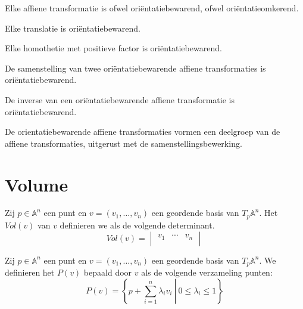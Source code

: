 \documentclass[main.tex]{subfiles}
\begin{document}
\begin{st}
  Elke affiene transformatie is ofwel ori\"entatiebewarend, ofwel ori\"entatieomkerend.
\end{st}

\begin{st}
  Elke translatie is ori\"entatiebewarend.
\end{st}

\begin{st}
  Elke homothetie met positieve factor is ori\"entatiebewarend.
\end{st}

\begin{st}
  De samenstelling van twee ori\"entatiebewarende affiene transformaties is ori\"entatiebewarend.
\end{st}

\begin{st}
  De inverse van een ori\"entatiebewarende affiene transformatie is ori\"entatiebewarend.
\end{st}

\begin{st}
  De orientatiebewarende affiene transformaties vormen een deelgroep van de affiene transformaties, uitgerust met de samenstellingsbewerking.
\end{st}

\section{Volume}
\label{sec:volume}

\begin{de}
  Zij $p\in \mathbb{A}^{n}$ een punt en $v= (v_{1},\dotsc,v_{n})$ een geordende basis van $T_{p}\mathbb{A}^{n}$.
  Het  $Vol(v)$ van $v$ definieren we als de volgende determinant.
  \[
  Vol(v) = 
  \begin{vmatrix}
    v_{1} & \cdots & v_{n}\\
  \end{vmatrix}
  \]
\end{de}

\begin{de}
  Zij $p\in \mathbb{A}^{n}$ een punt en $v= (v_{1},\dotsc,v_{n})$ een geordende basis van $T_{p}\mathbb{A}^{n}$.
  We definieren het  $P(v)$ bepaald door $v$ als de volgende verzameling punten:
  \[ P(v) = \left\{\left. p + \sum_{i=1}^{n}\lambda_{i}v_{i} \ \right|\ 0 \le \lambda_{i} \le 1 \right\} \]
\end{de}
\end{document}
